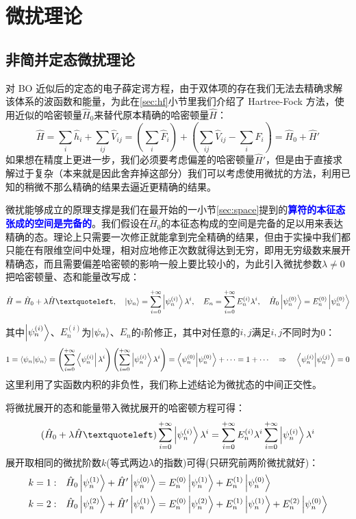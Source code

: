 \section{微扰理论}
\subsection{非简并定态微扰理论}
对 BO 近似后的定态的电子薛定谔方程，由于双体项的存在我们无法去精确求解该体系的波函数和能量，为此在\ref{sec:hf}小节里我们介绍了 Hartree-Fock 方法，使用近似的哈密顿量$\hat{H}_0$来替代原本精确的哈密顿量$\hat{H}$：
\[\hat{H}=\sum_{i}\hat{h}_i+\sum_{ij}\hat{V}_{ij}=\left(\sum_{i}\hat{F}_i\right)+\left(\sum_{ij}\hat{V}_{ij}-\sum_{i}\hat{F}_i\right)=\hat{H}_0+\hat{H}'\]
如果想在精度上更进一步，我们必须要考虑偏差的哈密顿量$\hat{H}'$，但是由于直接求解过于复杂（本来就是因此舍弃掉这部分）我们可以考虑使用微扰的方法，利用已知的稍微不那么精确的结果去逼近更精确的结果。

微扰能够成立的原理支撑是我们在最开始的一小节\ref{sec:space}提到的\textcolor{blue}{\textbf{算符的本征态张成的空间是完备的}}。我们假设在$\hat{H}_0$的本征态构成的空间是完备的足以用来表达精确的态。理论上只需要一次修正就能拿到完全精确的结果，但由于实操中我们都只能在有限维空间中处理，相对应地修正次数就得达到无穷，即用无穷级数来展开精确态，而且需要偏差哈密顿的影响一般上要比较小的，为此引入微扰参数$\lambda\neq0$把哈密顿量、态和能量改写成：
\[\hat{H}=\hat{H}_0+\lambda\hat{H}‘, \quad \ket{\psi_n}=\sum_{i=0}^{+\infty}\ket{\psi_n^{(i)}}\lambda^i, \quad E_n=\sum_{i=0}^{+\infty}E_n^{(i)}\lambda^i, \quad \hat{H}_0\ket{\psi_n^{(0)}}=E_n^{(0)}\ket{\psi_n^{(0)}}\]

其中$\ket{\psi_n^{(i)}}$、$E_n^{(i)}$为$\ket{\psi_n}$、$E_n$的$i$阶修正，其中对任意的$i,j$满足$i,j$不同时为0：
\[1=\bra{\psi_n}\ket{\psi_n}=\left(\sum_{i=0}^{+\infty}\bra{\psi_n^{(i)}}\lambda^i\right)\left(\sum_{i=0}^{+\infty}\ket{\psi_n^{(i)}}\lambda^i\right)=\bra{\psi_n^{(0)}}\ket{\psi_n^{(0)}}+\cdots=1 +\cdots \quad \Rightarrow \quad \bra{\psi_n^{(i)}}\ket{\psi_n^{(j)}}=0\]
这里利用了实函数内积的非负性，我们称上述结论为微扰态的中间正交性。

将微扰展开的态和能量带入微扰展开的哈密顿方程可得：
\[(\hat{H}_0+\lambda\hat{H}‘)\sum_{i=0}^{+\infty}\ket{\psi_n^{(i)}}\lambda^i=\sum_{i=0}^{+\infty}E_n^{(i)}\lambda^i\sum_{i=0}^{+\infty}\ket{\psi_n^{(i)}}\lambda^i\]
展开取相同的微扰阶数$k$(等式两边$\lambda$的指数)可得(只研究前两阶微扰就好)：
\[\begin{aligned}
k=1: \quad & \hat{H}_0\ket{\psi_n^{(1)}}+\hat{H}'\ket{\psi_n^{(0)}}=E_n^{(0)}\ket{\psi_n^{(1)}}+E_n^{(1)}\ket{\psi_n^{(0)}}\\
k=2: \quad & \hat{H}_0\ket{\psi_n^{(2)}}+\hat{H}'\ket{\psi_n^{(1)}}=E_n^{(0)}\ket{\psi_n^{(2)}}+E_n^{(1)}\ket{\psi_n^{(1)}}+E_n^{(2)}\ket{\psi_n^{(0)}}
\end{aligned}\]

